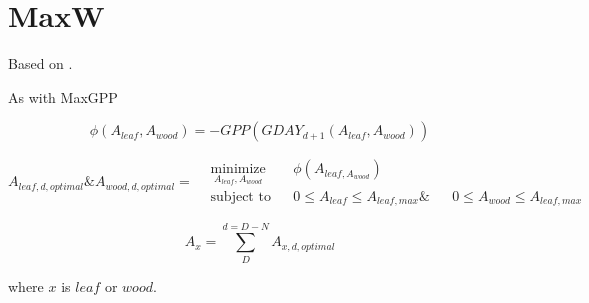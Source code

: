 \section{MaxW}

Based on \citep{McMurtrie2013}.

As with MaxGPP 


\begin{equation}
	\phi(A_{leaf},A_{wood}) = - GPP (GDAY_{d+1}(A_{leaf},A_{wood}))
\end{equation}


\begin{equation*}
A_{leaf,d,optimal} \text{\&} A_{wood,d,optimal}=
\begin{aligned}
& \underset{A_{leaf}, A_{wood}}{\text{minimize}}
& & \phi(A_{leaf,A_{wood}}) \\
& \text{subject to}
& & 0 \leq A_{leaf} \leq A_{leaf,max} \&
& & 0 \leq A_{wood} \leq A_{leaf,max}
\end{aligned}
\end{equation*}

\begin{equation}
	A_{x}= \sum_{D}^{d=D-N} A_{x,d,optimal}
\end{equation}

where $x$ is $leaf$ or $wood$.

